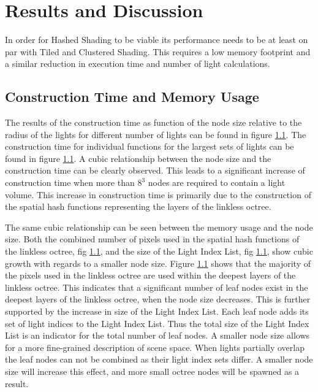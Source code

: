 \section{Results and Discussion}

In order for Hashed Shading to be viable its performance needs to be at least on par
with Tiled and Clustered Shading. This requires a low memory footprint and a similar
reduction in execution time and number of light calculations.



\subsection{Construction Time and Memory Usage}

The results of the construction time as function of the node size relative to the radius
of the lights for different number of lights can be found in figure \ref{}. The
construction time for individual functions for the largest sets of lights can be found in
figure \ref{}. A cubic relationship between the node size and the construction time can be
clearly observed. This leads to a  significant increase of construction time when more
than $8^3$ nodes are required to contain a light volume.
This increase in construction time is primarily due to the construction of the spatial
hash functions representing the layers of the linkless octree.

The same cubic relationship can be seen between the memory usage and the node size. Both the
combined number  of pixels used in the spatial hash functions of the linkless octree, fig \ref{},
and the size of the Light Index List, fig \ref{}, show cubic growth with regards to a smaller
node size. Figure \ref{} shows that the majority of the pixels used in the linkless octree
are used within the deepest layers of the linkless octree. This indicates that
a significant number of leaf nodes exist in the deepest layers of the linkless octree,
when the node size decreases. This is further supported by the increase in size of the Light
Index List. Each leaf node adds its set of light indices to the Light Index List. Thus the
total size of the Light Index List is an indicator for the total number of leaf nodes.
A smaller node size allows for a more fine-grained description of scene space. When lights
partially overlap the leaf nodes can not be combined as their light index sets differ. A
smaller node size will increase this effect, and more small octree nodes will be spawned
as a result.

